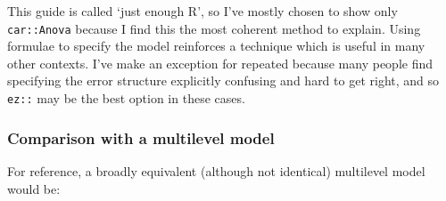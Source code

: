 \documentclass[]{article}
\newenvironment{Shaded}{\begin{snugshade}}{\end{snugshade}}
\newcommand{\KeywordTok}[1]{\textcolor[rgb]{0.13,0.29,0.53}{\textbf{#1}}}
\newcommand{\DataTypeTok}[1]{\textcolor[rgb]{0.13,0.29,0.53}{#1}}
\newcommand{\DecValTok}[1]{\textcolor[rgb]{0.00,0.00,0.81}{#1}}
\newcommand{\StringTok}[1]{\textcolor[rgb]{0.31,0.60,0.02}{#1}}
\newcommand{\OperatorTok}[1]{\textcolor[rgb]{0.81,0.36,0.00}{\textbf{#1}}}
\newcommand{\NormalTok}[1]{#1}
\theoremstyle{definition}
\theoremstyle{definition}
\theoremstyle{definition}
\theoremstyle{remark}
\begin{document}
This guide is called `just enough R', so I've mostly chosen to show only
\texttt{car::Anova} because I find this the most coherent method to
explain. Using formulae to specify the model reinforces a technique
which is useful in many other contexts. I've make an exception for
repeated because many people find specifying the error structure
explicitly confusing and hard to get right, and so \texttt{ez::} may be
the best option in these cases.

\subsubsection*{Comparison with a multilevel
model}\label{comparison-with-a-multilevel-model}

For reference, a broadly equivalent (although not identical) multilevel
model would be:

\begin{Shaded}
\end{Shaded}
\end{document}
